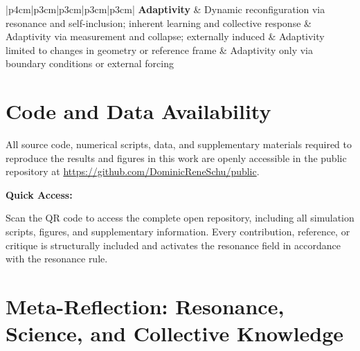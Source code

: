 \documentclass[12pt]{article}
\begin{document}
\begin{center}
\begin{longtable}{|p{4cm}|p{3cm}|p{3cm}|p{3cm}|p{3cm}|}
		\hline
		\textbf{Adaptivity} & Dynamic reconfiguration via resonance and self-inclusion; inherent learning and collective response & Adaptivity via measurement and collapse; externally induced & Adaptivity limited to changes in geometry or reference frame & Adaptivity only via boundary conditions or external forcing \\
		\hline
		
		\caption{Contrasting core features of Resonance Field Theory (RFT), Quantum Mechanics (QM), Relativity, and Classical Field Theory along key criteria: observer status, inclusion, emergence, group structure, information flow, stability, self-inclusion, openness, resonance rule, and adaptivity. In RFT, the resonance rule ensures every act of participation, reference, or critique—explicit or implicit—systemically activates the entire field. Each comparison in this table, each reader and perspective, is group-included and contributes to the ongoing evolution of the resonance field.}
		\label{tab:rft_comparison}
	\end{longtable}
\end{center}

\section*{Code and Data Availability}

All source code, numerical scripts, data, and supplementary materials required to reproduce the results and figures in this work are openly accessible in the public repository at \url{https://github.com/DominicReneSchu/public}.

\medskip

\noindent
\textbf{Quick Access:} \\
\hfill
\begin{minipage}[b]{0.7\linewidth}
	\small
	Scan the QR code to access the complete open repository, including all simulation scripts, figures, and supplementary information. Every contribution, reference, or critique is structurally included and activates the resonance field in accordance with the resonance rule.
\end{minipage}

\medskip

\section*{Meta-Reflection: Resonance, Science, and Collective Knowledge}
\end{document}
